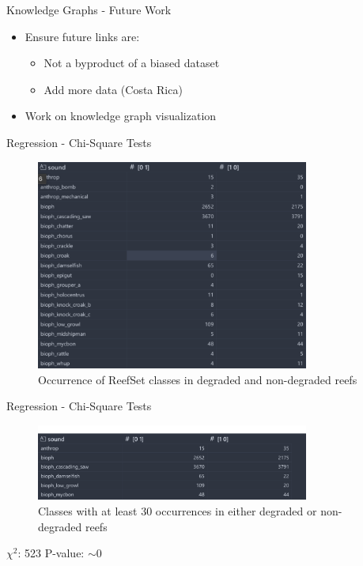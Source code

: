 \begin{frame}{Knowledge Graphs - Future Work}
    \begin{itemize}
        \item Ensure future links are:
        \begin{itemize}
            \item Not a byproduct of a biased dataset
            \item Add more data (Costa Rica)
        \end{itemize}
        \item Work on knowledge graph visualization
    \end{itemize}
\end{frame}

\begin{frame}{Regression - Chi-Square Tests}
    \begin{figure}
        \centering
        \includegraphics[height=0.8\textheight,width=0.8\textwidth,keepaspectratio]{images/reefset_classes.png}
        \caption{Occurrence of ReefSet classes in degraded and non-degraded reefs}
    \end{figure}
\end{frame}

\begin{frame}{Regression - Chi-Square Tests}
    \begin{figure}
        \centering
        \includegraphics[height=0.8\textheight,width=0.8\textwidth,keepaspectratio]{images/chi_square_test.png}
        \caption{Classes with at least 30 occurrences in either degraded or non-degraded reefs}
    \end{figure}
    $\chi^2$: 523
    \newline
    P-value: $\sim$0
\end{frame}

